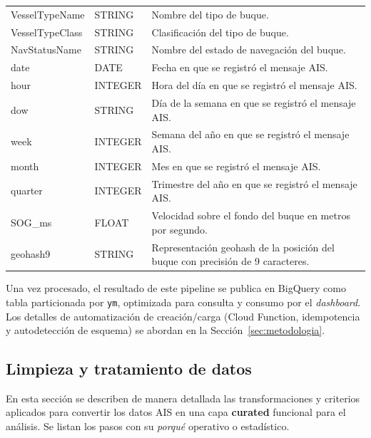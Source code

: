 \documentclass[10pt]{article}
\begin{document}
\begin{table}[H]
\begin{tabular}{@{}llp{8cm}@{}}
  VesselTypeName & STRING & Nombre del tipo de buque. \\
  VesselTypeClass & STRING & Clasificación del tipo de buque. \\
  NavStatusName & STRING & Nombre del estado de navegación del buque. \\
  date & DATE & Fecha en que se registró el mensaje AIS. \\
  hour & INTEGER & Hora del día en que se registró el mensaje AIS. \\
  dow & STRING & Día de la semana en que se registró el mensaje AIS. \\
  week & INTEGER & Semana del año en que se registró el mensaje AIS. \\
  month & INTEGER & Mes en que se registró el mensaje AIS. \\
  quarter & INTEGER & Trimestre del año en que se registró el mensaje AIS. \\
  SOG\_ms & FLOAT & Velocidad sobre el fondo del buque en metros por segundo. \\
  geohash9 & STRING & Representación geohash de la posición del buque con precisión de 9 caracteres. \\
  \bottomrule
  \end{tabular}
\end{table}

Una vez procesado, el resultado de este pipeline se publica en BigQuery como tabla particionada por \texttt{ym}, optimizada para consulta y consumo por el \textit{dashboard}. Los detalles de automatización de creación/carga (Cloud Function, idempotencia y autodetección de esquema) se abordan en la Sección~\ref{sec:metodologia}.
\subsection{Limpieza y tratamiento de datos} %
\label{sec:cleaning}

En esta sección se describen de manera detallada las transformaciones y criterios aplicados para convertir los datos AIS en una capa \textbf{curated} funcional para el análisis. Se listan los pasos con su \emph{porqué} operativo o estadístico.
\end{document}
